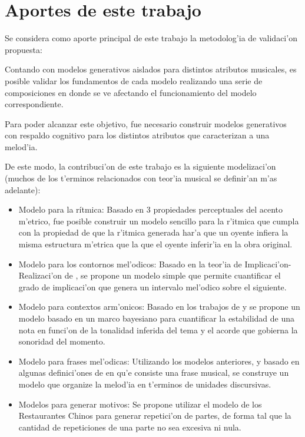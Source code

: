 \section{Aportes de este trabajo}
Se considera como aporte principal de este trabajo la metodolog'ia de validaci'on propuesta: 

Contando con modelos generativos aislados para distintos atributos musicales, es posible validar los fundamentos de cada modelo
realizando una serie de composiciones en donde se ve afectando el funcionamiento del modelo correspondiente.

Para poder alcanzar este objetivo, fue necesario construir modelos ge\-nerativos con respaldo cognitivo para los distintos atributos que 
caracterizan a una melod'ia. 

De este modo, la contribuci'on de este trabajo es la siguiente modelizaci'on (muchos de los t'erminos relacionados con teor'ia musical se definir'an
m'as adelante):

\begin{itemize}
 \item Modelo para la r\'itmica: Basado en 3 propiedades perceptuales del acento m'etrico, fue posible construir un modelo sencillo para la r'itmica
 que cumpla con la propiedad de que la r'itmica generada har'a que un oyente infiera la misma estructura m'etrica que la que el 
 oyente inferir'ia en la obra original.

 \item Modelo para los contornos mel'odicos: Basado en la teor'ia de Implicaci'on-Realizaci'on de \cite{Narmour91}, se propone un modelo simple que permite cuantificar 
 el grado de implicaci'on que genera un intervalo mel'odico sobre el siguiente.

 \item Modelo para contextos arm'onicos: Basado en los trabajos de \cite{Krumhansl90} y \cite{Lerdahl2001} se propone un modelo basado en un marco bayesiano
 para cuantificar la estabilidad de una nota en funci'on de la tonalidad inferida del tema y el acorde que gobierna la sonoridad del momento.

 \item Modelo para frases mel'odicas: Utilizando los modelos anteriores, y basado en algunas definici'ones de en qu'e consiste una 
 frase musical, se construye un modelo que organize la melod'ia en t'erminos de unidades discursivas.

 \item Modelos para generar motivos: Se propone utilizar el modelo de los Restaurantes Chinos \citep{Teh2007} para generar repetici'on de partes, 
 de forma tal que la cantidad de repeticiones de una parte no sea excesiva ni nula.

\end{itemize}


